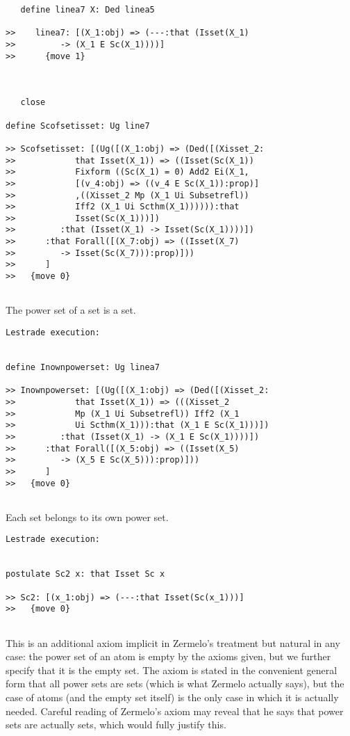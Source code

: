 \documentclass[12pt]{article}
\begin{document}
\begin{verbatim}
   define linea7 X: Ded linea5

>>    linea7: [(X_1:obj) => (---:that (Isset(X_1)
>>         -> (X_1 E Sc(X_1))))]
>>      {move 1}



   close

define Scofsetisset: Ug line7

>> Scofsetisset: [(Ug([(X_1:obj) => (Ded([(Xisset_2:
>>            that Isset(X_1)) => ((Isset(Sc(X_1))
>>            Fixform ((Sc(X_1) = 0) Add2 Ei(X_1,
>>            [(v_4:obj) => ((v_4 E Sc(X_1)):prop)]
>>            ,((Xisset_2 Mp (X_1 Ui Subsetrefl))
>>            Iff2 (X_1 Ui Scthm(X_1)))))):that
>>            Isset(Sc(X_1)))])
>>         :that (Isset(X_1) -> Isset(Sc(X_1))))])
>>      :that Forall([(X_7:obj) => ((Isset(X_7)
>>         -> Isset(Sc(X_7))):prop)]))
>>      ]
>>   {move 0}


\end{verbatim}

The power set of a set is a set.

\begin{verbatim}Lestrade execution:


define Inownpowerset: Ug linea7

>> Inownpowerset: [(Ug([(X_1:obj) => (Ded([(Xisset_2:
>>            that Isset(X_1)) => (((Xisset_2
>>            Mp (X_1 Ui Subsetrefl)) Iff2 (X_1
>>            Ui Scthm(X_1))):that (X_1 E Sc(X_1)))])
>>         :that (Isset(X_1) -> (X_1 E Sc(X_1))))])
>>      :that Forall([(X_5:obj) => ((Isset(X_5)
>>         -> (X_5 E Sc(X_5))):prop)]))
>>      ]
>>   {move 0}


\end{verbatim}

Each set belongs to its own power set.

\begin{verbatim}Lestrade execution:


postulate Sc2 x: that Isset Sc x

>> Sc2: [(x_1:obj) => (---:that Isset(Sc(x_1)))]
>>   {move 0}


\end{verbatim}

This is an additional axiom implicit in Zermelo's treatment but natural in any case:  the power set of an atom is empty by the axioms given, but we further
specify that it is the empty set.  The axiom is stated in the convenient general form that all power sets are sets (which is what Zermelo actually says), but the case of atoms (and the empty set itself)
is the only case in which it is actually needed.  Careful reading of Zermelo's axiom may reveal that he says that power sets are actually sets, which would fully justify this.
\end{document}
